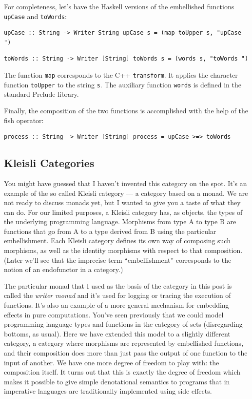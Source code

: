 For completeness, let's have the Haskell versions of the embellished
functions \texttt{upCase} and \texttt{toWords}:

\begin{verbatim}
upCase :: String -> Writer String upCase s = (map toUpper s, "upCase ")
\end{verbatim}

\begin{verbatim}
toWords :: String -> Writer [String] toWords s = (words s, "toWords ")
\end{verbatim}

The function \texttt{map} corresponds to the C++ \texttt{transform}. It
applies the character function \texttt{toUpper} to the string
\texttt{s}. The auxiliary function \texttt{words} is defined in the
standard Prelude library.

Finally, the composition of the two functions is accomplished with the
help of the fish operator:

\begin{verbatim}
process :: String -> Writer [String] process = upCase >=> toWords
\end{verbatim}

\subsection{Kleisli Categories}\label{kleisli-categories}

You might have guessed that I haven't invented this category on the
spot. It's an example of the so called Kleisli category --- a category
based on a monad. We are not ready to discuss monads yet, but I wanted
to give you a taste of what they can do. For our limited purposes, a
Kleisli category has, as objects, the types of the underlying
programming language. Morphisms from type A to type B are functions that
go from A to a type derived from B using the particular embellishment.
Each Kleisli category defines its own way of composing such morphisms,
as well as the identity morphisms with respect to that composition.
(Later we'll see that the imprecise term ``embellishment'' corresponds
to the notion of an endofunctor in a category.)

The particular monad that I used as the basis of the category in this
post is called the \emph{writer monad} and it's used for logging or
tracing the execution of functions. It's also an example of a more
general mechanism for embedding effects in pure computations. You've
seen previously that we could model programming-language types and
functions in the category of sets (disregarding bottoms, as usual). Here
we have extended this model to a slightly different category, a category
where morphisms are represented by embellished functions, and their
composition does more than just pass the output of one function to the
input of another. We have one more degree of freedom to play with: the
composition itself. It turns out that this is exactly the degree of
freedom which makes it possible to give simple denotational semantics to
programs that in imperative languages are traditionally implemented
using side effects.

